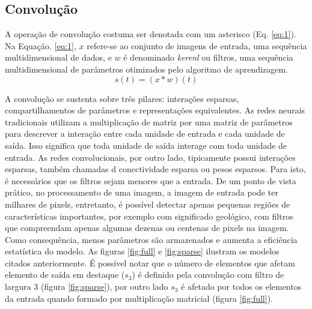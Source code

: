 \subsection{Convolução}

A operação de convolução costuma ser denotada com um asterisco (Eq. \ref{eq:1}).
Na Equação. \ref{eq:1}, $x$ refere-se ao conjunto de imagens de entrada, uma sequência multidimensional
de dados, e $w$ é denominado \textit{kerenl} ou filtros, uma sequência multidimensional de parâmetros otimizados pelo algoritmo
de aprendizagem.
\begin{equation}
 s(t) = (x * w)(t)
 \label{eq:1}
\end{equation}

A convolução se sustenta sobre três pilares: interações esparsas, compartilhamentos
de parâmetros e representações equivalentes. As redes neurais tradicionais
utilizam a multiplicação de matriz por uma matriz de parâmetros para descrever
a interação entre cada unidade de entrada e cada unidade de saída. Isso
significa que toda unidade de saída interage com toda unidade de entrada.
As redes convolucionais, por outro lado, tipicamente possui interações
esparsas, também chamadas d conectividade esparsa ou pesos esparsos.
Para isto, é necessários que os filtros sejam menores que a entrada.
De um ponto de vista prático, no processamento de uma imagem,
a imagem de entrada pode ter milhares de pixels, entretanto, é 
possível detectar apenas pequenas regiões de características importantes,
por exemplo com significado geológico, com filtros que compreendam apenas
algumas dezenas ou centenas de pixels na imagem. Como consequência,
menos parâmetros são armazenados e aumenta a eficiência estatística do
modelo. As figuras \ref{fig:full} e \ref{fig:sparse} ilustram
os modelos citados anteriormente. É possível notar que o número de elementos
que afetam elemento de saída em destaque ($s_3$) é definido pela convolução
com filtro de largura 3 (figura \ref{fig:sparse}), por outro lado $s_3$ é
afetado por todos os elementos da entrada quando formado por multiplicação
matricial (figura \ref{fig:full}).

